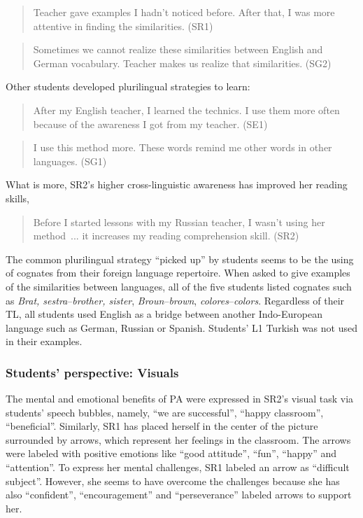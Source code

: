 \documentclass[output=paper]{../langscibook}
\begin{document}
\begin{quote}
Teacher gave examples I hadn’t noticed before. After that, I was more attentive in finding the similarities. (SR1)
\end{quote}

\begin{quote}
Sometimes we cannot realize these similarities between English and German vocabulary. Teacher makes us realize that similarities. (SG2)
\end{quote}

\noindent Other students developed plurilingual strategies to learn: 

\begin{quote}
After my English teacher, I learned the technics. I use them more often because of the awareness I got from my teacher. (SE1)
\end{quote}

\begin{quote}
I use this method more. These words remind me other words in other languages. (SG1)
\end{quote}

\noindent What is more, SR2’s higher cross-linguistic awareness has improved her reading skills, 

\begin{quote}\sloppy
Before I started lessons with my Russian teacher, I wasn’t using her method~... it increases my reading comprehension skill. (SR2) 
\end{quote}

The common plurilingual strategy ``picked up'' by students seems to be the using of cognates from their foreign language repertoire. When asked to give examples of the similarities between languages, all of the five students listed cognates such as \emph{Brat, sestra}--\emph{brother, sister}, \emph{Broun}--\emph{brown}, \emph{colores}--\emph{colors}. Regardless of their TL, all students used English as a bridge between another Indo-European language such as German, Russian or Spanish. Students’ L1 Turkish was not used in their examples.


\subsubsection{Students’ perspective: Visuals}
The mental and emotional benefits of PA were expressed in SR2’s visual task via students’ speech bubbles, namely, “we are successful”, “happy classroom”, “beneficial”. Similarly, SR1 has placed herself in the center of the picture surrounded by arrows, which represent her feelings in the classroom. The arrows were labeled with positive emotions like “good attitude”, “fun”, “happy” and “attention”. To express her mental challenges, SR1 labeled an arrow as “difficult subject”. However, she seems to have overcome the challenges because she has also “confident”, “encouragement” and “perseverance” labeled arrows to support her.
\end{document}
